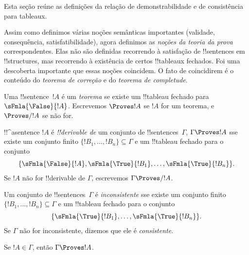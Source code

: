 \documentclass[../../../include/open-logic-section]{subfiles}
\begin{document}
      {}
      {}
      

\begin{editorial}
Esta seção reúne as definições da relação de demonstrabilidade e de
consistência para tableaux.
\end{editorial}

\begin{explain}
Assim como definimos várias noções semânticas importantes (validade,
consequência, satisfatibilidade), agora definimos as \emph{noções da
teoria da prova} correspondentes. Elas não são definidas recorrendo à
satisfação de !!{sentence}s em !!{structure}s, mas recorrendo à
existência de certos !!{tableau}x fechados. Foi uma descoberta
importante que essas noções coincidem. O fato de coincidirem é o
conteúdo do \emph{teorema de correção} e do \emph{teorema de completude}.
\end{explain}


\begin{defn}[Teoremas]
Uma !!{sentence}~$!A$ é um \emph{teorema} se existe um !!{tableau}
fechado para~$\sFmla{\False}{!A}$. Escrevemos $\Proves !A$ se $!A$ for
um teorema, e $\Proves/ !A$ se não for.
\end{defn}

\begin{defn}[!!^{derivability}]
!!^a{sentence} $!A$ é \emph{!!{derivable} de} um conjunto de
!!{sentence}s~$\Gamma$, $\Gamma \Proves !A$ sse existe um conjunto
finito $\{!B_1, \dots, !B_n\} \subseteq \Gamma$ e um !!{tableau}
fechado para o conjunto
\[
\{
  \sFmla{\False}{!A},
  \sFmla{\True}{!B_1}, \dots,
  \sFmla{\True}{!B_n}
  \}.
\]
Se $!A$ não for !!{derivable} de $\Gamma$, escrevemos $\Gamma \Proves/
!A$.
\end{defn}

\begin{defn}[Consistência]
Um conjunto de !!{sentence}s~$\Gamma$ é \emph{inconsistente} sse
existe um conjunto finito $\{!B_1, \dots, !B_n\} \subseteq \Gamma$ e
um !!{tableau} fechado para o conjunto
\[
\{
  \sFmla{\True}{!B_1}, \dots,
  \sFmla{\True}{!B_n}  
  \}.
\]
Se $\Gamma$ não for inconsistente, dizemos que ele é
\emph{consistente}.
\end{defn}

\begin{prop}[Reflexividade]
Se $!A \in \Gamma$, então $\Gamma \Proves !A$.
\end{prop}
\end{document}
